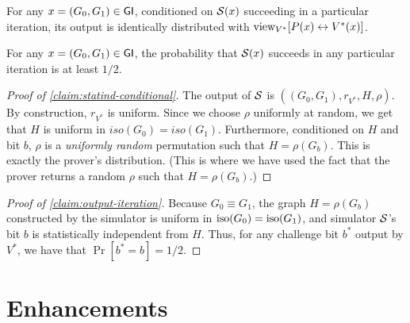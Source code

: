 \documentclass[11pt]{article}
\begin{document}
\begin{claim}
  \label{claim:statind-conditional}
  For any $x = (G_{0},G_{1}) \in \mathsf{GI}$, conditioned on $\mathcal{S}(x)$
  succeeding in a particular iteration, its output is identically
  distributed with $\text{view}_{V^{*}}[ P(x) \leftrightarrow V^{*}(x) ]$.
\end{claim}

\begin{claim}
  \label{claim:output-iteration}
  For any $x = (G_{0},G_{1}) \in \mathsf{GI}$, the probability that $\mathcal{S}(x)$
  succeeds in any particular iteration is at least $1/2$.
\end{claim}

\begin{proof}[Proof of \cref{claim:statind-conditional}]
  The output of $\mathcal{S}$ is $((G_{0}, G_{1}), r_{V^*},H,\rho)$. By
  construction, $r_{V^*}$ is uniform.  Since we choose $\rho$
  uniformly at random, we get that $H$ is uniform in
  $iso(G_0)=iso(G_1)$.  Furthermore, conditioned on $H$ and bit $b$,
  $\rho$ is a \emph{uniformly random} permutation such that
  $H=\rho(G_b)$.  This is exactly the prover's distribution.  (This is
  where we have used the fact that the prover returns a random $\rho$
  such that $H = \rho(G_{b})$.)
\end{proof}

\begin{proof}[Proof of \cref{claim:output-iteration}]
  Because $G_0 \equiv G_1$, the graph $H=\rho(G_{b})$ constructed by
  the simulator is uniform in $\text{iso}(G_{0}) = \text{iso}(G_{1})$, and
  simulator $\mathcal{S}$'s bit $b$ is statistically independent from $H$.
  Thus, for any challenge bit $b^{*}$ output by $V^*$, we have that
  $\Pr[b^{*}=b] = 1/2$.
\end{proof}

\section{Enhancements}
\label{sec:enhancements}
\end{document}
